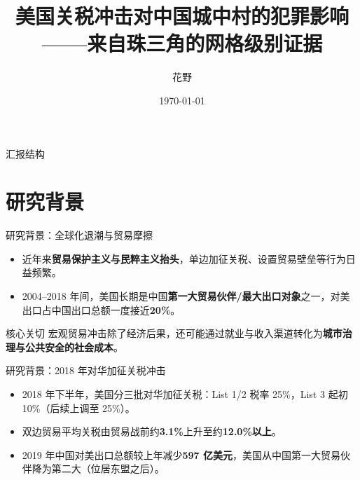 \documentclass[aspectratio=169,10pt]{ctexbeamer}
\title[关税冲击与城中村犯罪]{美国关税冲击对中国城中村的犯罪影响\\——来自珠三角的网格级别证据}
\author[花野]{花野}
\institute[经济学院]{经济学院}
\date{\today}
\begin{document}
\begin{frame}[plain]
  \titlepage
\end{frame}

\begin{frame}{汇报结构}
  \tableofcontents
\end{frame}

\section{研究背景}

\begin{frame}{研究背景：全球化退潮与贸易摩擦}
  \begin{itemize}
    \item 近年来\textbf{贸易保护主义与民粹主义抬头}，单边加征关税、设置贸易壁垒等行为日益频繁。
    \item 2004--2018 年间，美国长期是中国\textbf{第一大贸易伙伴/最大出口对象}之一，对美出口占中国出口总额一度接近\textbf{20\%}。
  \end{itemize}
  \vspace{0.4em}
  \begin{block}{核心关切}
    宏观贸易冲击除了经济后果，还可能通过就业与收入渠道转化为\textbf{城市治理与公共安全的社会成本}。
  \end{block}
\end{frame}

\begin{frame}{研究背景：2018 年对华加征关税冲击}
  \begin{itemize}
    \item 2018 年下半年，美国分三批对华加征关税：List 1/2 税率 25\%，List 3 起初 10\%（后续上调至 25\%）。
    \item 双边贸易平均关税由贸易战前约\textbf{3.1\%}上升至约\textbf{12.0\%以上}\citep{bown2021trade}。
    \item 2019 年中国对美出口总额较上年减少\textbf{597 亿美元}，美国从中国第一大贸易伙伴降为第二大（位居东盟之后）。
  \end{itemize}
\end{frame}
\end{document}
